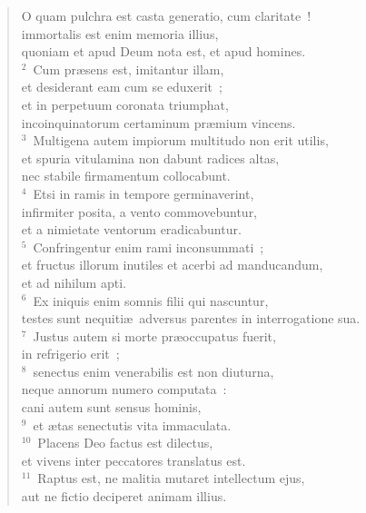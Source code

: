\begin{flushleft}\begin{verse}\vspace{-19pt}O quam pulchra est casta generatio, cum claritate~!\\ immortalis est enim memoria illius,\\ quoniam et apud Deum nota est, et apud homines.\\
${}^{2}$~Cum pr\ae sens est, imitantur illam,\\ et desiderant eam cum se eduxerit~;\\ et in perpetuum coronata triumphat,\\ incoinquinatorum certaminum pr\ae mium vincens.\\
${}^{3}$~Multigena autem impiorum multitudo non erit utilis,\\ et spuria vitulamina non dabunt radices altas,\\ nec stabile firmamentum collocabunt.\\
${}^{4}$~Etsi in ramis in tempore germinaverint,\\ infirmiter posita, a vento commovebuntur,\\ et a nimietate ventorum eradicabuntur.\\
${}^{5}$~Confringentur enim rami inconsummati~;\\ et fructus illorum inutiles et acerbi ad manducandum,\\ et ad nihilum apti.\\
${}^{6}$~Ex iniquis enim somnis filii qui nascuntur,\\ testes sunt nequiti\ae\ adversus parentes in interrogatione sua.\\
${}^{7}$~Justus autem si morte pr\ae occupatus fuerit,\\ in refrigerio erit~;\\
${}^{8}$~senectus enim venerabilis est non diuturna,\\ neque annorum numero computata~:\\ cani autem sunt sensus hominis,\\
${}^{9}$~et \ae tas senectutis vita immaculata.\\
${}^{10}$~Placens Deo factus est dilectus,\\ et vivens inter peccatores translatus est.\\
${}^{11}$~Raptus est, ne malitia mutaret intellectum ejus,\\ aut ne fictio deciperet animam illius.\\

\end{verse}
\end{flushleft}
